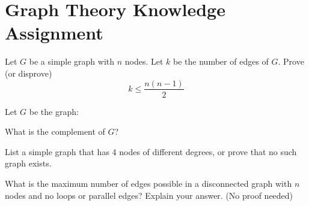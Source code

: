 \documentclass[10pt,letterpaper, cm]{hmcpset}
\begin{document}
\section*{Graph Theory Knowledge Assignment}

\begin{problem}[1]

  Let $G$ be a simple graph with $n$ nodes. 
  Let $k$ be the number of edges of $G$. Prove (or disprove)
  \[k \leq \frac{n(n-1)}{2}\]
\end{problem}

\begin{problem}[2]

  Let $G$ be the graph:

  \begin{center}
  \end{center}
What is the complement of $G$?
\end{problem}

\begin{problem}[3]
List a simple graph that has 4 nodes of different degrees, or prove that no such graph exists.
\end{problem}

\begin{problem}[4]
What is the maximum number of edges possible in a disconnected graph with $n$ nodes and no loops or parallel edges?  Explain your answer. (No proof needed)
\end{problem}
\end{document}
